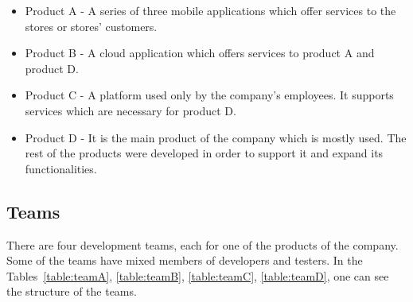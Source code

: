 \begin{itemize}
\item Product A - A series of three mobile applications which offer services to the stores or stores' customers.
\item Product B - A cloud application which offers services to product A and product D.
\item Product C - A platform used only by the company's employees. It supports services which are necessary for product D.
\item Product D - It is the main product of the company which is mostly used. The rest of the products were developed in order to support it and expand its functionalities.

\end{itemize}

\subsection{Teams}
There are four development teams, each for one of the products of the company. Some of the teams have mixed members of developers and testers. In the Tables~\ref{table:teamA}, \ref{table:teamB}, \ref{table:teamC}, \ref{table:teamD}, one can see the structure of the teams. \\

